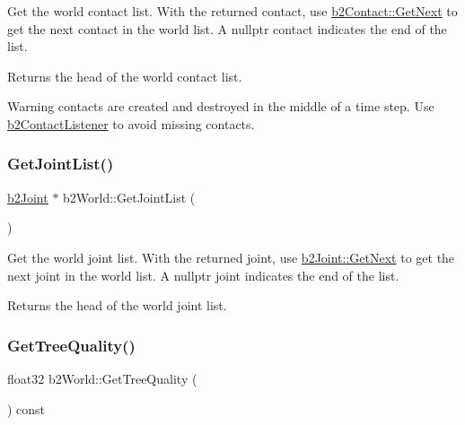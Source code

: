 Get the world contact list. With the returned contact, use \hyperlink{classb2_contact_aebfebb1e4b27dc0bd7aa120093e3d650}{b2\+Contact\+::\+Get\+Next} to get the next contact in the world list. A nullptr contact indicates the end of the list. \begin{DoxyReturn}{Returns}
the head of the world contact list. 
\end{DoxyReturn}
\begin{DoxyWarning}{Warning}
contacts are created and destroyed in the middle of a time step. Use \hyperlink{classb2_contact_listener}{b2\+Contact\+Listener} to avoid missing contacts. 
\end{DoxyWarning}
\mbox{\label{classb2_world_a55db7240f8290aa02cab79f181934de8}} 
\subsubsection{\texorpdfstring{Get\+Joint\+List()}{GetJointList()}}
{\footnotesize\ttfamily \hyperlink{classb2_joint}{b2\+Joint} $\ast$ b2\+World\+::\+Get\+Joint\+List (\begin{DoxyParamCaption}{ }\end{DoxyParamCaption})\hspace{0.3cm}{\ttfamily [inline]}}

Get the world joint list. With the returned joint, use \hyperlink{classb2_joint_a1a0e2137b631010750c728cb4e276e5d}{b2\+Joint\+::\+Get\+Next} to get the next joint in the world list. A nullptr joint indicates the end of the list. \begin{DoxyReturn}{Returns}
the head of the world joint list. 
\end{DoxyReturn}
\mbox{\label{classb2_world_a562935b3b8161dd18a467e02f479e88a}} 
\subsubsection{\texorpdfstring{Get\+Tree\+Quality()}{GetTreeQuality()}}
{\footnotesize\ttfamily float32 b2\+World\+::\+Get\+Tree\+Quality (\begin{DoxyParamCaption}{ }\end{DoxyParamCaption}) const}


